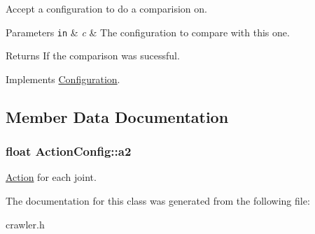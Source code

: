 Accept a configuration to do a comparision on. 


\begin{DoxyParams}[1]{Parameters}
\mbox{\tt in}  & {\em c} & The configuration to compare with this one. \\
\hline
\end{DoxyParams}
\begin{DoxyReturn}{Returns}
If the comparison was sucessful. 
\end{DoxyReturn}


Implements \hyperlink{classConfiguration_a0bc4a5154c2836cc8976049810b35548}{Configuration}.



\subsection{Member Data Documentation}
\hypertarget{classActionConfig_a6e64f27b8bc62c437d43d45a0bc201c8}{
\subsubsection[{a2}]{\setlength{\rightskip}{0pt plus 5cm}float Action\-Config\-::a2}}\label{classActionConfig_a6e64f27b8bc62c437d43d45a0bc201c8}
\hyperlink{classAction}{Action} for each joint. 

The documentation for this class was generated from the following file\-:\begin{DoxyCompactItemize}
\item 
crawler.\-h\end{DoxyCompactItemize}
